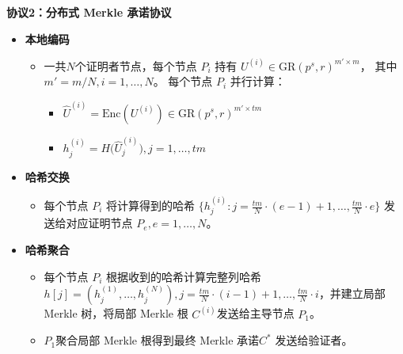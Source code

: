 \documentclass{article}
\begin{document}
\begin{tcolorbox}[
  width=\textwidth,
  colframe=black,
  colback=white,
  sharp corners,
  boxsep=2pt,
  left=2pt,right=2pt,top=3pt,bottom=3pt
]
\begin{itemize}
\end{itemize}
\end{tcolorbox}

\begin{tcolorbox}[
  width=\textwidth,
  colframe=black,
  colback=white,
  sharp corners,
  boxsep=2pt,
  left=2pt,right=2pt,top=3pt,bottom=3pt
]

\textbf{协议2：分布式 Merkle 承诺协议}

\begin{itemize}

  \item \textbf{本地编码}
  \begin{itemize}
    \item 一共\( N \)个证明者节点，每个节点 \( P_i \) 持有 
    \( {U}^{(i)} \in \mathrm{GR}(p^s, r)^{m'\times m} \)，
    其中 \( m' = m/N ,i=1,\ldots,N\)。
    每个节点 \( P_i \) 并行计算：
    \begin{itemize}
      \item 
      \(\hat{U}^{(i)} = \mathrm{Enc}({U}^{(i)}) \in \mathrm{GR}(p^s, r)^{m'\times tm} \)
      
      \item  
      \(h_j^{(i)} = H\big(\hat{U}_j^{(i)}\big),j = 1, \dots, tm\)
      
    \end{itemize}
   
  \end{itemize}

  \item \textbf{哈希交换}
  \begin{itemize}
    \item 每个节点 \( P_i \) 将计算得到的哈希 
    \(\{h_j^{(i)}:j=\frac{tm}{N}\cdot (e-1)+1,\ldots,\frac{tm}{N}\cdot e\}\) 
    发送给对应证明节点 \( P_e,e=1,\ldots,N\)。
  
  \end{itemize}

  \item \textbf{哈希聚合}
  \begin{itemize}
    \item 每个节点 \( P_i \) 根据收到的哈希计算完整列哈希 
    \(h[j]=(h_j^{(1)},\ldots,h_j^{(N)}),j=\frac{tm}{N}\cdot (i-1)+1,\ldots,\frac{tm}{N}\cdot i\)，并建立局部 Merkle 树，将局部 Merkle 根 \(C^{(i)}\)发送给主导节点 \(P_{1}\)。

    \item  \(P_{1}\)聚合局部 Merkle 根得到最终 Merkle 承诺\(C^{*}\) 发送给验证者。
  
  \end{itemize}


\end{itemize}

\end{tcolorbox}
\end{document}
